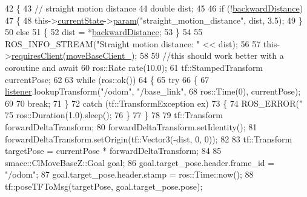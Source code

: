 \begin{DoxyCode}
42     \{
43         \textcolor{comment}{// straight motion distance}
44         \textcolor{keywordtype}{double} dist;
45 
46         \textcolor{keywordflow}{if} (!\hyperlink{classsm__dance__bot_1_1move__base__z__client_1_1CbNavigateBackwards_a4067b6379c6f1c8e7d6d90a1206e98f8}{backwardDistance})
47         \{
48             this->\hyperlink{classsmacc_1_1SmaccClientBehavior_af76fc9b877542ed5caf033f820c107d0}{currentState}->\hyperlink{classsmacc_1_1ISmaccState_a4982f2187ed6da337462721146e8ef70}{param}(\textcolor{stringliteral}{"straight\_motion\_distance"}, dist, 3.5);
49         \}
50         \textcolor{keywordflow}{else}
51         \{
52             dist = *\hyperlink{classsm__dance__bot_1_1move__base__z__client_1_1CbNavigateBackwards_a4067b6379c6f1c8e7d6d90a1206e98f8}{backwardDistance};
53         \}
54 
55         ROS\_INFO\_STREAM(\textcolor{stringliteral}{"Straight motion distance: "} << dist);
56 
57         this->\hyperlink{classsmacc_1_1SmaccClientBehavior_a917f001e763a1059af337bf4e164f542}{requiresClient}(\hyperlink{classsm__dance__bot_1_1move__base__z__client_1_1CbNavigateBackwards_a03ed133f7064857034dd7eadf0618674}{moveBaseClient\_});
58 
59         \textcolor{comment}{//this should work better with a coroutine and await}
60         ros::Rate rate(10.0);
61         tf::StampedTransform currentPose;
62 
63         \textcolor{keywordflow}{while} (ros::ok())
64         \{
65             \textcolor{keywordflow}{try}
66             \{
67                 \hyperlink{classsm__dance__bot_1_1move__base__z__client_1_1CbNavigateBackwards_aeaaa632b142737c65bc87587aa02a3bf}{listener}.lookupTransform(\textcolor{stringliteral}{"/odom"}, \textcolor{stringliteral}{"/base\_link"},
68                                          ros::Time(0), currentPose);
69 
70                 \textcolor{keywordflow}{break};
71             \}
72             \textcolor{keywordflow}{catch} (tf::TransformException ex)
73             \{
74                 ROS\_ERROR(\textcolor{stringliteral}{"%
75                 ros::Duration(1.0).sleep();
76             \}
77         \}
78 
79         tf::Transform forwardDeltaTransform;
80         forwardDeltaTransform.setIdentity();
81         forwardDeltaTransform.setOrigin(tf::Vector3(-dist, 0, 0));
82 
83         tf::Transform targetPose = currentPose * forwardDeltaTransform;
84 
85         smacc::ClMoveBaseZ::Goal goal;
86         goal.target\_pose.header.frame\_id = \textcolor{stringliteral}{"/odom"};
87         goal.target\_pose.header.stamp = ros::Time::now();
88         tf::poseTFToMsg(targetPose, goal.target\_pose.pose);
}
\end{DoxyCode}
